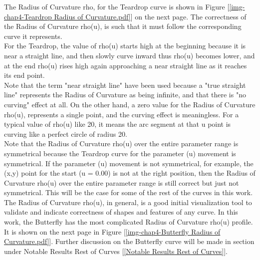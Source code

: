 The Radius of Curvature rho, for the Teardrop curve is shown in Figure  [\ref  {img-chap4-Teardrop Radius of Curvature.pdf}] on the next page. The correctness of the Radius of Curvature rho(u), is such that it must follow the corresponding curve it represents. \\

For the Teardrop, the value of rho(u) starts high at the beginning because it is near a straight line, and then slowly curve inward thus rho(u) becomes lower, and at the end rho(u) rises high again approaching a near straight line as it reaches its end point.\\

Note that the term "near straight line" have been used because a "true straight line" represents the Radius of Curvature as being infinite, and that there is "no curving" effect at all. On the other hand, a zero value for the Radius of Curvature rho(u), represents a single point, and the curving effect is meaningless. For a typical value of rho(u) like 20, it means the arc segment at that u point is curving like a perfect circle of radius 20. \\ 

Note that the Radius of Curvature rho(u) over the entire parameter range is symmetrical because the Teardrop curve for the parameter (u) movement is symmetrical. If the parameter (u) movement is not symmetrical, for example, the (x,y) point for the start (u = 0.00) is not at the right position, then the Radius of Curvature rho(u) over the entire parameter range is still correct but just not symmetrical. This will be the case for some of the rest of the curves in this work.\\

The Radius of Curvature rho(u), in general, is a good initial visualization tool to validate and indicate correctness of shapes and features of any curve. In this work, the Butterfly has the most complicated Radius of Curvature rho(u) profile. It is shown on the next page in Figure [\ref{img-chap4-Butterfly Radius of Curvature.pdf}]. Further discussion on the Butterfly curve will be made in section under Notable Results Rest of Curves [\ref{Notable Results Rest of Curves}].

\clearpage
\pagebreak
	

